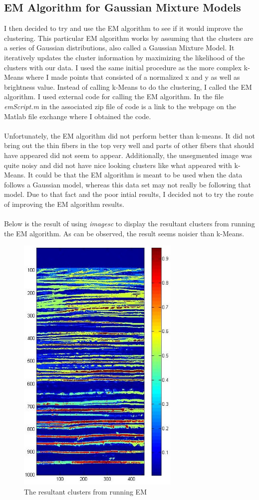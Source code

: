 \documentclass[11pt,psfig]{article}
\begin{document}
\subsection{EM Algorithm for Gaussian Mixture Models}
I then decided to try and use the EM algorithm to see if it would improve the clustering. This particular EM algorithm works by assuming that the clusters are a series of Gaussian distributions, also called a Gaussian Mixture Model. It iteratively updates the cluster information by maximizing the likelihood of the clusters with our data. I used the same initial procedure as the more complex k-Means where I made points that consisted of a normalized x and y as well as brightness value. Instead of calling k-Means to do the clustering, I called the EM algorithm. I used external code for calling the EM algorithm. In the file \textit{emScript.m} in the associated zip file of code is a link to the webpage on the Matlab file exchange where I obtained the code. \\
\\
Unfortunately, the EM algorithm did not perform better than k-means. It did not bring out the thin fibers in the top very well and parts of other fibers that should have appeared did not seem to appear. Additionally, the unsegmented image was quite noisy and did not have nice looking clusters like what appeared with k-Means. It could be that the EM algorithm is meant to be used when the data follows a Gaussian model, whereas this data set may not really be following that model. Due to that fact and the poor intial results, I decided not to try the route of improving the EM algorithm results. \\
\\
Below is the result of using \textit{imagesc} to display the resultant clusters from running the EM algorithm. As can be observed, the result seems noisier than k-Means.
\begin{figure}[H]
\centering
\includegraphics[height=5in]{emResultUnsegmented.jpg}
\caption{The resultant clusters from running EM}
\end{figure}
\end{document}
